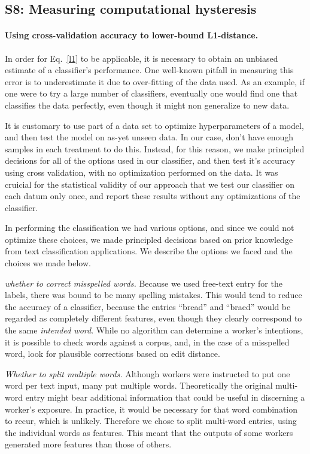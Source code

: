 \documentclass[12pt]{article}
\begin{document}
\subsection*{S8: Measuring computational hysteresis}
\begin{itemize}
	\paragraph{Using cross-validation accuracy to lower-bound L1-distance.}
	In order for Eq.~\ref{l1} to be applicable, it is necessary to obtain
	an unbiased estimate of a classifier's performance.  One well-known
	pitfall in measuring this error is to underestimate it due to 
	over-fitting of the data used.  As an example, if one were to try 
	a large number of classifiers, eventually one would find one that
	classifies the data perfectly, even though it might non generalize to
	new data.

	It is customary to use part of a data set to optimize hyperparameters of
	a model, and then test the model on as-yet unseen data.  In our case,
	don't have enough samples in each treatment to do this.  Instead, for 
	this reason, we make principled decisions for all of the options used
	in our classifier, and then test it's accuracy using cross validation,
	with no optimization performed on the data.  It was cruicial for 
	the statistical validity of our approach that we test our classifier on 
	each datum only once, and report these results without any optimizations
	of the classifier.

	In performing the classification we had various options, and since we
	could not optimize these choices, we made principled decisions based on
	prior knowledge from text classification applications.  We describe the
	options we faced and the choices we made below.
	
	\textit{whether to correct misspelled words.}  Because we used free-text
	entry for the labels, there was bound to be many spelling mistakes.
	This would tend to reduce the accuracy of a classifier, because the 
	entries ``bread'' and ``braed'' would be regarded as completely different
	features, even though they clearly correspond to the same 
	\textit{intended word}.  While no algorithm can determine a worker's 
	intentions, it is possible to check words against a corpus, and, in the
	case of a misspelled word, look for plausible corrections based on 
	edit distance.

	\textit{Whether to split multiple words.}  Although workers were 
	instructed to put one word per text input, many put multiple words.
	Theoretically the original multi-word entry might bear additional 
	information that could be useful in discerning a worker's exposure. 
	In practice, it would be necessary for that word combination to recur,
	which is unlikely.  Therefore we chose to split multi-word entries,
	using the individual words as features.  This meant that the outputs of
	some workers generated more features than those of others.


\end{itemize}
\end{document}
